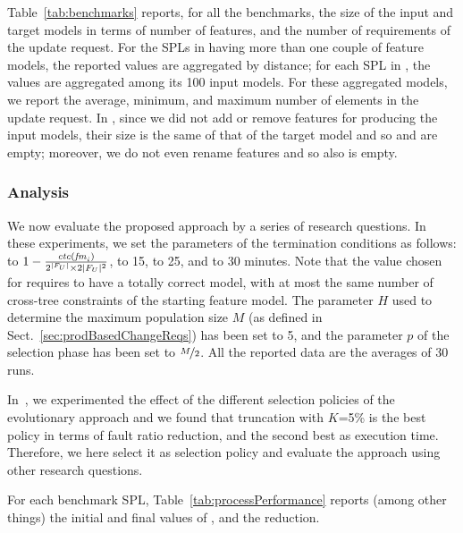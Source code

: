 \begin{tikzborder}{\cite{Gargantini16:validation}}
\begin{tikzborder}{\cite{gargantini_combinatorial_2017}}
\begin{tikzborder}{\cite{garn2019}}
\begin{tikzborder}{\cite{arcaini2019achieving}}
	Table~\ref{tab:benchmarks} reports, for all the benchmarks, the size of the input and target models in terms of number of features, and the number of requirements of the update request. For the SPLs in \benchReal having more than one couple of feature models, the reported values are aggregated by distance; for each SPL in \benchMut, the values are aggregated among its 100 input models. For these aggregated models, we report the average, minimum, and maximum number of elements in the update request. In \benchMut, since we did not add or remove features for producing the input models, their size is the same of that of the target model and so \Fadd and \Frem are empty; moreover, we do not even rename features and so also \Ftbr is empty.\be
	
	\subsubsection{Analysis}\label{sec:analysis}
	
	\bb We now evaluate the proposed approach by a series of research questions. In these experiments, we set the parameters of the termination conditions as follows: \thF to $1 - \frac{\mathit{ctc}(\mathit{fm}_i)}{{2^{|F_U|} \times 2|F_U|^2}}$, \thNI to 15, \thI to 25, and \thT to 30 minutes. Note that the value chosen for \thF requires to have a totally correct model, with at most the same number of cross-tree constraints of the starting feature model. The parameter $H$ used to determine the maximum population size $M$ (as defined in Sect.~\ref{sec:prodBasedChangeReqs}) has been set to 5, and the parameter $p$ of the selection phase has been set to $\nicefrac{M}{2}$. All the reported data are the averages of 30 runs.
	
	In~\cite{arcaini_evolutionary_2018}, we experimented the effect of the different selection policies of the evolutionary approach and we found that truncation with $K$=5\% is the best policy in terms of fault ratio reduction, and the second best as execution time. Therefore, we here select it as selection policy and evaluate the approach using other research questions.
	
	
	For each benchmark SPL, Table~\ref{tab:processPerformance} reports (among other things) the initial and final values of \FR, and the \FR reduction.\be
	

\end{tikzborder}
\end{tikzborder}
\end{tikzborder}
\end{tikzborder}
